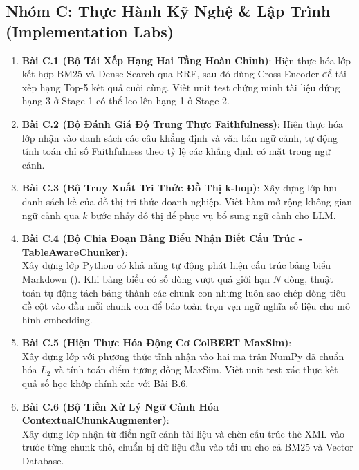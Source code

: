 \subsection{Nhóm C: Thực Hành Kỹ Nghệ \& Lập Trình (Implementation Labs)}
\begin{enumerate}
  \item \textbf{Bài C.1 (Bộ Tái Xếp Hạng Hai Tầng Hoàn Chỉnh)}:
  Hiện thực hóa lớp  kết hợp BM25 và Dense Search qua RRF, sau đó dùng Cross-Encoder để tái xếp hạng Top-5 kết quả cuối cùng. Viết unit test chứng minh tài liệu đứng hạng 3 ở Stage 1 có thể leo lên hạng 1 ở Stage 2.

  \item \textbf{Bài C.2 (Bộ Đánh Giá Độ Trung Thực Faithfulness)}:
  Hiện thực hóa lớp  nhận vào danh sách các câu khẳng định và văn bản ngữ cảnh, tự động tính toán chỉ số Faithfulness theo tỷ lệ các khẳng định có mặt trong ngữ cảnh.

  \item \textbf{Bài C.3 (Bộ Truy Xuất Tri Thức Đồ Thị k-hop)}:
  Xây dựng lớp  lưu danh sách kề của đồ thị tri thức doanh nghiệp. Viết hàm  mở rộng không gian ngữ cảnh qua $k$ bước nhảy đồ thị để phục vụ bổ sung ngữ cảnh cho LLM.

  \item \textbf{Bài C.4 (Bộ Chia Đoạn Bảng Biểu Nhận Biết Cấu Trúc - TableAwareChunker)}: \\
  Xây dựng lớp Python  có khả năng tự động phát hiện cấu trúc bảng biểu Markdown (). Khi bảng biểu có số dòng vượt quá giới hạn $N$ dòng, thuật toán tự động tách bảng thành các chunk con nhưng luôn sao chép dòng tiêu đề cột vào đầu mỗi chunk con để bảo toàn trọn vẹn ngữ nghĩa số liệu cho mô hình embedding.

  \item \textbf{Bài C.5 (Hiện Thực Hóa Động Cơ ColBERT MaxSim)}: \\
  Xây dựng lớp  với phương thức tĩnh  nhận vào hai ma trận NumPy đã chuẩn hóa $L_2$ và tính toán điểm tương đồng MaxSim. Viết unit test xác thực kết quả số học khớp chính xác với Bài B.6.

  \item \textbf{Bài C.6 (Bộ Tiền Xử Lý Ngữ Cảnh Hóa ContextualChunkAugmenter)}: \\
  Xây dựng lớp  nhận từ điển ngữ cảnh tài liệu và chèn cấu trúc thẻ XML  vào trước từng chunk thô, chuẩn bị dữ liệu đầu vào tối ưu cho cả BM25 và Vector Database.
\end{enumerate}

